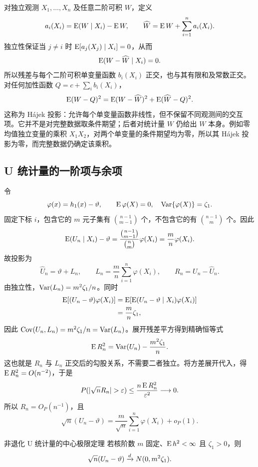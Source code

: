 对独立观测 $X_1,\ldots,X_n$ 及任意二阶可积 $W$，定义
\[
 a_i(X_i)=\operatorname{E}(W\mid X_i)-\operatorname{E} W,\qquad
 \widehat W=\operatorname{E} W+\sum_{i=1}^na_i(X_i).
\]
独立性保证当 $j\neq i$ 时 $\operatorname{E}[a_j(X_j)\mid X_i]=0$，从而
\[
 \operatorname{E}(W-\widehat W\mid X_i)=0.
\]
所以残差与每个二阶可积单变量函数 $b_i(X_i)$ 正交，也与其有限和及常数正交。对任何加性函数 $Q=c+\sum_ib_i(X_i)$，
\[
 \operatorname{E}(W-Q)^2=\operatorname{E}(W-\widehat W)^2+\operatorname{E}(\widehat W-Q)^2.
\]
这称为 H\'ajek 投影：允许每个单变量函数非线性，但不保留不同观测间的交互项。它并不是对完整数据取条件期望；后者对统计量 $W$ 仍给出 $W$ 本身。例如零均值独立变量的乘积 $X_1X_2$，对两个单变量的条件期望均为零，所以其 H\'ajek 投影为零，而完整数据仍确定该乘积。

\subsection{U 统计量的一阶项与余项}

令
\[
 \varphi(x)=h_1(x)-\vartheta,
 \qquad \operatorname{E}\varphi(X)=0,\quad\operatorname{Var}\{\varphi(X)\}=\zeta_1.
\]
固定下标 $i$，包含它的 $m$ 元子集有 $\binom{n-1}{m-1}$ 个，不包含它的有 $\binom{n-1}{m}$ 个。因此
\[
 \operatorname{E}(U_n\mid X_i)-\vartheta
 =\frac{\binom{n-1}{m-1}}{\binom nm}\varphi(X_i)
 =\frac mn\varphi(X_i).
\]
故投影为
\begin{equation}
 \widehat U_n=\vartheta+L_n,
 \qquad L_n=\frac mn\sum_{i=1}^n\varphi(X_i),
 \qquad R_n=U_n-\widehat U_n.
 \label{eq:ch4-hajek}
\end{equation}
由独立性，$\operatorname{Var}(L_n)=m^2\zeta_1/n$。同时
\begin{align*}
 \operatorname{E}[(U_n-\vartheta)\varphi(X_i)]
 &=\operatorname{E}[\operatorname{E}(U_n-\vartheta\mid X_i)\varphi(X_i)]\\
 &=\frac mn\zeta_1,
\end{align*}
因此 $\operatorname{Cov}(U_n,L_n)=m^2\zeta_1/n=\operatorname{Var}(L_n)$。展开残差平方得到精确恒等式
\begin{equation}
 \operatorname{E} R_n^2=\operatorname{Var}(U_n)-\frac{m^2\zeta_1}{n}.
 \label{eq:ch4-residual}
\end{equation}
这也就是 $R_n$ 与 $L_n$ 正交后的勾股关系，不需要二者独立。将方差展开代入，得 $\operatorname{E} R_n^2=O(n^{-2})$，于是
\[
 P(|\sqrt nR_n|>\varepsilon)
 \leq\frac{n\E R_n^2}{\varepsilon^2}\longrightarrow0.
\]
所以 $R_n=O_P(n^{-1})$，且
\begin{equation}
 \sqrt n(U_n-\vartheta)
 =\frac m{\sqrt n}\sum_{i=1}^n\varphi(X_i)+o_P(1).
 \label{eq:ch4-asym-linear}
\end{equation}

\begin{definitionbox}{非退化 U 统计量的中心极限定理}
若核阶数 $m$ 固定、$\operatorname{E} h^2<\infty$ 且 $\zeta_1>0$，则
\[
 \sqrt n(U_n-\vartheta)\xrightarrow{d} N(0,m^2\zeta_1).
\]
\end{definitionbox}

